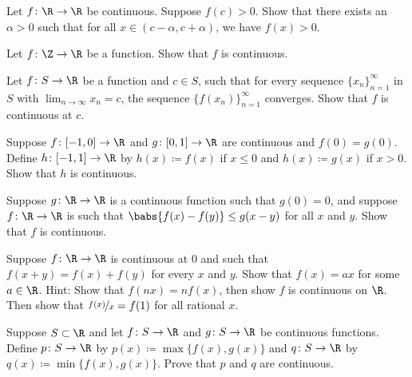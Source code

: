 \begin{exercise} \label{exercise:positivecontneigh}
Let $f \colon \R \to \R$ be continuous.  Suppose $f(c) > 0$.  Show that
there exists an $\alpha > 0$ such that for all $x \in (c-\alpha,c+\alpha)$,
we have $f(x) > 0$.
\end{exercise}

\begin{exercise}
Let $f \colon \Z \to \R$ be a function.  Show that $f$ is continuous.
\end{exercise}

\begin{exercise} \label{exercise:contseqalt}
Let $f \colon S \to \R$ be a function and $c \in S$, such that for every
sequence $\{ x_n \}_{n=1}^\infty$ in $S$ with $\lim_{n\to\infty} x_n = c$, the sequence
$\bigl\{ f(x_n) \bigr\}_{n=1}^\infty$ converges.  Show that $f$ is continuous at $c$.
\end{exercise}

\begin{exercise}
Suppose $f \colon [-1,0] \to \R$ and $g \colon [0,1] \to \R$ are continuous
and $f(0) = g(0)$.  Define $h \colon [-1,1] \to \R$ by 
$h(x) \coloneqq f(x)$ if $x \leq 0$ and $h(x) \coloneqq g(x)$ if $x > 0$.  Show that
$h$ is continuous.
\end{exercise}

\begin{exercise}
Suppose $g \colon \R \to \R$ is a continuous function such that $g(0) = 0$,
and suppose $f \colon \R \to \R$ is such that
$\babs{f(x)-f(y)} \leq g(x-y)$ for all $x$ and $y$.  Show that $f$ is
continuous.
\end{exercise}

\begin{exercise}[Challenging]
Suppose $f \colon \R \to \R$ is continuous at $0$ and
such that $f(x+y) = f(x) + f(y)$ for every $x$ and $y$.
Show that $f(x) = ax$ for some $a \in \R$.
Hint: Show that $f(nx) = nf(x)$, then show $f$ is continuous on $\R$.
Then show that $\nicefrac{f(x)}{x} = f(1)$ for all rational $x$.
\end{exercise}

\begin{exercise} \label{exercise:minmaxcont}
Suppose $S \subset \R$ and
let $f \colon S \to \R$ and
$g \colon S \to \R$ be continuous functions.
Define $p \colon S \to \R$ by
$p(x) \coloneqq \max \bigl\{ f(x) , g(x) \bigr\}$ and
$q \colon S \to \R$ by
$q(x) \coloneqq \min \bigl\{ f(x) , g(x) \bigr\}$.  Prove that $p$ and $q$ are
continuous.
\end{exercise}

